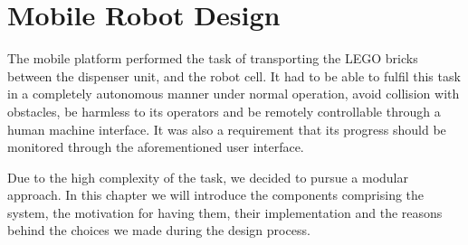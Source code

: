\chapter{Mobile Robot Design}\label{chap:mobile_robot_chapter}

The mobile platform performed the task of transporting the LEGO bricks between the dispenser unit, and the robot cell. It had to be able to fulfil this task in a completely autonomous manner under normal operation, avoid collision with obstacles, be harmless to its operators and be remotely controllable through a human machine interface. It was also a requirement that its progress should be monitored through the aforementioned user interface. 

Due to the high complexity of the task, we decided to pursue a modular approach. In this chapter we will introduce the components comprising the system, the motivation for having them, their implementation and the reasons behind the choices we made during the design process.












